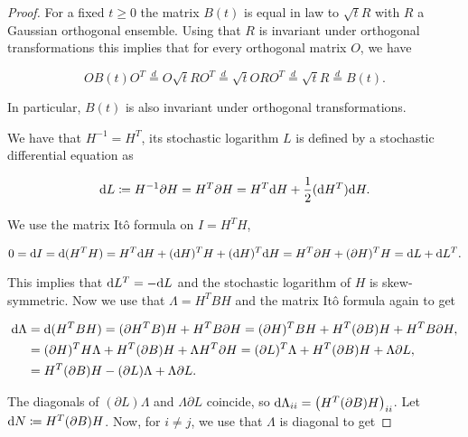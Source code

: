 \begin{proof}
    For a fixed $t\ge 0$ the matrix $B(t)$ is equal in law to $\sqrt tR$ with $R$ a Gaussian orthogonal ensemble. Using that $R$ is invariant under orthogonal transformations this implies that for every orthogonal matrix $O$, we have

    \begin{equation*}
        O B(t) O^T \overset{d}{=} O \sqrt{t} R O^T \overset{d}= \sqrt{t} O R O^T \overset{d}{=} \sqrt{t} R \overset{d}{=} B(t).
    \end{equation*}

    In particular, $B(t)$ is also invariant under orthogonal transformations.

    We have that $H^{-1} = H^T$, its stochastic logarithm $L$ is defined by a stochastic differential equation as

    \begin{equation*}
        \mathrm d L \coloneqq H^{-1} \partial H = H^T \partial H = H^T \mathrm d H + \frac12 (\mathrm d H^T) \mathrm d H.
    \end{equation*}

    We use the matrix Itô formula on $I = H^T H$,

    \begin{equation*}
        0 = \mathrm d I = \mathrm d(H^T H) = H^T \mathrm d H + (\mathrm d H)^T H + (\mathrm d H)^T \mathrm d H = H^T \partial H + (\partial H)^T H = \mathrm d L + \mathrm d L^T.
    \end{equation*}

    This implies that $\mathrm d L^T = - \mathrm d L$ and the stochastic logarithm of $H$ is skew-symmetric. Now we use that $\Lambda = H^T B H$ and the matrix Itô formula again to get

    \begin{align*}
        \mathrm d \Lambda &= \mathrm d (H^T B H) = (\partial H^T B)H + H^TB\partial H = (\partial H)^T B H + H^T (\partial B) H + H^T B \partial H, \\ 
        &= (\partial H)^T H \Lambda + H^T (\partial B) H + \Lambda H^T \partial H = (\partial L)^T \Lambda + H^T (\partial B) H + \Lambda \partial L, \\ 
        &= H^T (\partial B) H - (\partial L) \Lambda + \Lambda \partial L. 
    \end{align*}

    The diagonals of $(\partial L)\Lambda$ and $\Lambda \partial L$ coincide, so $\mathrm d \Lambda_{ii} = \left(H^T(\partial B)H\right)_{ii}$. Let $\mathrm d N \coloneqq H^T(\partial B)H$. Now, for $i\neq j$, we use that $\Lambda$ is diagonal to get


\end{proof}
